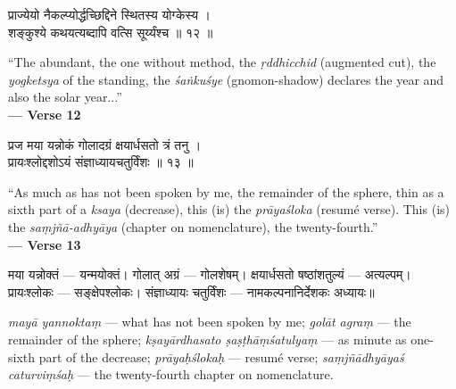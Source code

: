 \documentclass[11pt,a4paper]{article}
\newcommand{\dev}[1]{{\devanagarifont #1}}
\newenvironment{bilingualverse}{%
  \begin{paracol}{2}
  \fontsize{10.5}{13}\selectfont
}{%
  \end{paracol}
  \vspace{0.3cm}
}
\newenvironment{paracol}[1]{\begingroup}{\endgroup}
\newenvironment{leftcolumn*}{\begingroup}{\endgroup}
\newenvironment{rightcolumn}{\begingroup}{\endgroup}
\begin{document}
\begin{bilingualverse}
\begin{leftcolumn*}
\dev{प्राज्येयो नैकल्प्योर्द्धच्छिद्दिने स्थितस्य योग्केस्य ।}\\
\dev{शङ्कुश्ये कथयत्यब्दापि वत्सि सूर्य्यंश्च ॥ १२ ॥}
\end{leftcolumn*}
\begin{rightcolumn}
``The abundant, the one without method, the \textit{ṛddhicchid} (augmented cut), the \textit{yogketsya} of the standing, the \textit{śaṅkuśye} (gnomon-shadow) declares the year and also the solar year...''\\[0.3cm]
\hfill\textbf{— Verse 12}
\end{rightcolumn}
\end{bilingualverse}

\begin{bilingualverse}
\begin{leftcolumn*}
\dev{प्रज मया यन्नोकं गोलादग्रं क्षयार्धसतो त्रं तनु ।}\\
\dev{प्रायःश्लोद्दशोऽयं संज्ञाध्यायचतुर्विंशः ॥ १३ ॥}
\end{leftcolumn*}
\begin{rightcolumn}
``As much as has not been spoken by me, the remainder of the sphere, thin as a sixth part of a \textit{ksaya} (decrease), this (is) the \textit{prāyaśloka} (resumé verse). This (is) the \textit{saṃjñā-adhyāya} (chapter on nomenclature), the twenty-fourth.''\\[0.3cm]
\hfill\textbf{— Verse 13}
\end{rightcolumn}
\end{bilingualverse}

\begin{paracol}{2}
\begin{leftcolumn*}
\dev{मया यन्नोक्तं} — यन्मयोक्तं। \dev{गोलात् अग्रं} — गोलशेषम्। \dev{क्षयार्धसतो षष्ठांशतुल्यं} — अत्यल्पम्। \dev{प्रायःश्लोकः} — सङ्क्षेपश्लोकः। \dev{संज्ञाध्यायः चतुर्विंशः} — नामकल्पनानिर्देशकः अध्यायः॥
\end{leftcolumn*}
\begin{rightcolumn}
\textit{mayā yannoktaṃ} --- what has not been spoken by me; \textit{golāt agraṃ} --- the remainder of the sphere; \textit{kṣayārdhasato ṣaṣṭhāṃśatulyaṃ} --- as minute as one-sixth part of the decrease; \textit{prāyaḥślokaḥ} --- resumé verse; \textit{saṃjñādhyāyaś caturviṃśaḥ} --- the twenty-fourth chapter on nomenclature.
\end{rightcolumn}
\end{paracol}
\end{document}
